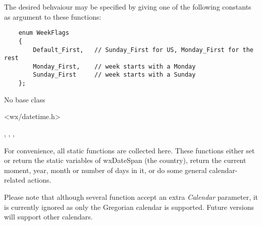 The desired behvaiour may be specified by giving one of the following
constants as argument to these functions:

\begin{verbatim}
    enum WeekFlags
    {
        Default_First,   // Sunday_First for US, Monday_First for the rest
        Monday_First,    // week starts with a Monday
        Sunday_First     // week starts with a Sunday
    };
\end{verbatim}


No base class


<wx/datetime.h>


,\rtfsp
{},\rtfsp
{},\rtfsp
{}



For convenience, all static functions are collected here. These functions
either set or return the static variables of wxDateSpan (the country), return
the current moment, year, month or number of days in it, or do some general
calendar-related actions.

Please note that although several function accept an extra {\it Calendar}
parameter, it is currently ignored as only the Gregorian calendar is
supported. Future versions will support other calendars.


